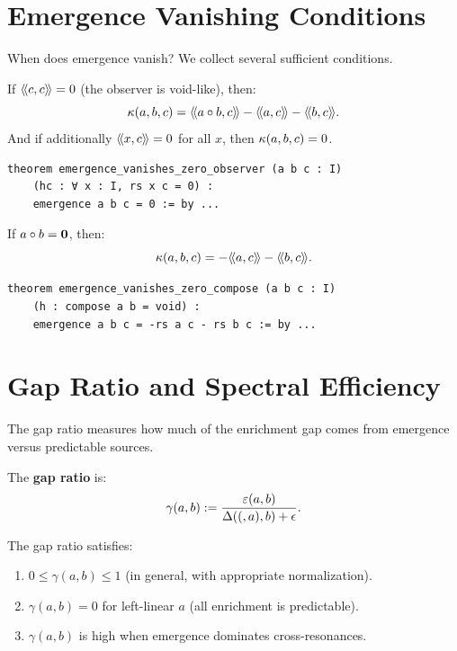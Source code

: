 \section{Emergence Vanishing Conditions}

When does emergence vanish? We collect several sufficient conditions.

\begin{theorem}
\label{thm:emergence-vanishes-zero-observer}
If $\langle\!\langle c, c \rangle\!\rangle = 0$ (the observer is void-like), then:
\[
  \kappa(a,b,c) = \langle\!\langle a \circ b, c \rangle\!\rangle - \langle\!\langle a, c \rangle\!\rangle - \langle\!\langle b, c \rangle\!\rangle.
\]
And if additionally $\langle\!\langle x, c \rangle\!\rangle = 0$ for all $x$, then $\kappa(a,b,c) = 0$.
\end{theorem}

\begin{lstlisting}[caption={Emergence vanishing (IDT\_v3\_Emergence.lean)}]
theorem emergence_vanishes_zero_observer (a b c : I)
    (hc : ∀ x : I, rs x c = 0) :
    emergence a b c = 0 := by ...
\end{lstlisting}

\begin{theorem}
\label{thm:emergence-vanishes-zero-compose}
If $a \circ b = \mathbf{0}$, then:
\[
  \kappa(a,b,c) = -\langle\!\langle a, c \rangle\!\rangle - \langle\!\langle b, c \rangle\!\rangle.
\]
\end{theorem}

\begin{lstlisting}[caption={Emergence for zero compose (IDT\_v3\_Emergence.lean)}]
theorem emergence_vanishes_zero_compose (a b c : I)
    (h : compose a b = void) :
    emergence a b c = -rs a c - rs b c := by ...
\end{lstlisting}


\section{Gap Ratio and Spectral Efficiency}

The gap ratio measures how much of the enrichment gap comes from emergence
versus predictable sources.

\begin{definition}
\label{def:gap-ratio}
The \textbf{gap ratio} is:
\[
  \gamma(a,b) := \frac{\varepsilon(a,b)}{\Delta((,a),b) + \epsilon}.
\]
\end{definition}

\begin{theorem}
\label{thm:gap-ratio-properties}
The gap ratio satisfies:
\begin{enumerate}
  \item $0 \leq \gamma(a,b) \leq 1$ (in general, with appropriate normalization).
  \item $\gamma(a,b) = 0$ for left-linear $a$ (all enrichment is predictable).
  \item $\gamma(a,b)$ is high when emergence dominates cross-resonances.
\end{enumerate}
\end{theorem}

